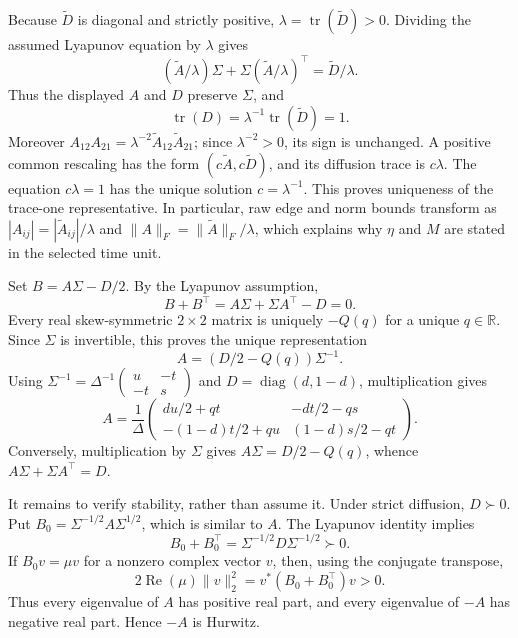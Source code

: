 Because \(\widetilde D\) is diagonal and strictly positive, \(\lambda=\operatorname{tr}(\widetilde D)>0\).  Dividing the assumed Lyapunov equation by \(\lambda\) gives
\[
 (\widetilde A/\lambda)\Sigma+\Sigma(\widetilde A/\lambda)^{\top}
 =\widetilde D/\lambda.
\]
Thus the displayed \(A\) and \(D\) preserve \(\Sigma\), and
\[
 \operatorname{tr}(D)=\lambda^{-1}\operatorname{tr}(\widetilde D)=1.
\]
Moreover \(A_{12}A_{21}=\lambda^{-2}\widetilde A_{12}\widetilde A_{21}\); since \(\lambda^{-2}>0\), its sign is unchanged.  A positive common rescaling has the form \((c\widetilde A,c\widetilde D)\), and its diffusion trace is \(c\lambda\).  The equation \(c\lambda=1\) has the unique solution \(c=\lambda^{-1}\).  This proves uniqueness of the trace-one representative.  In particular, raw edge and norm bounds transform as \(|A_{ij}|=|\widetilde A_{ij}|/\lambda\) and \(\lVert A\rVert_F=\lVert\widetilde A\rVert_F/\lambda\), which explains why \(\eta\) and \(M\) are stated in the selected time unit.

Set \(B=A\Sigma-D/2\).  By the Lyapunov assumption,
\[
 B+B^{\top}=A\Sigma+\Sigma A^{\top}-D=0.
\]
Every real skew-symmetric \(2\times2\) matrix is uniquely \(-Q(q)\) for a unique \(q\in\mathbb R\).  Since \(\Sigma\) is invertible, this proves the unique representation
\[
 A=(D/2-Q(q))\Sigma^{-1}.
\]
Using \(\Sigma^{-1}=\Delta^{-1}\begin{pmatrix}u&-t\\-t&s\end{pmatrix}\) and \(D=\operatorname{diag}(d,1-d)\), multiplication gives
\[
 A=\frac1\Delta
 \begin{pmatrix}
 du/2+qt&-dt/2-qs\\
 -(1-d)t/2+qu&(1-d)s/2-qt
 \end{pmatrix}.
\]
Conversely, multiplication by \(\Sigma\) gives \(A\Sigma=D/2-Q(q)\), whence \(A\Sigma+\Sigma A^{\top}=D\).

It remains to verify stability, rather than assume it.  Under strict diffusion, \(D\succ0\).  Put \(B_0=\Sigma^{-1/2}A\Sigma^{1/2}\), which is similar to \(A\).  The Lyapunov identity implies
\[
 B_0+B_0^{\top}=\Sigma^{-1/2}D\Sigma^{-1/2}\succ0.
\]
If \(B_0v=\mu v\) for a nonzero complex vector \(v\), then, using the conjugate transpose,
\[
 2\operatorname{Re}(\mu)\lVert v\rVert_2^2
 =v^*(B_0+B_0^{\top})v>0.
\]
Thus every eigenvalue of \(A\) has positive real part, and every eigenvalue of \(-A\) has negative real part.  Hence \(-A\) is Hurwitz.

